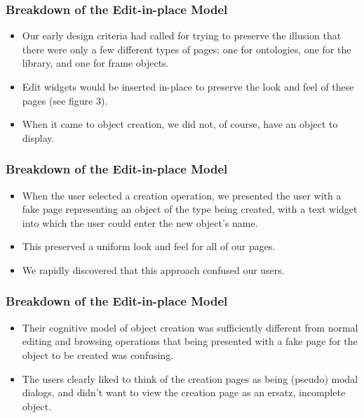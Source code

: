 \documentclass{beamer}
\begin{document}
\begin{frame}
\frametitle{Breakdown of the Edit-in-place Model}

\begin{itemize}
\item Our early design criteria had called for trying to preserve the illusion that there were only a few different types of pages: one for ontologies, one for the library, and one for frame objects.
\item Edit widgets would be inserted in-place to preserve the look and feel of these pages (see figure 3).
\item When it came to object creation, we did not, of course, have an object to display.
\end{itemize}

\end{frame}

\begin{frame}
\frametitle{Breakdown of the Edit-in-place Model}

\begin{itemize}
\item When the user selected a creation operation, we presented the user with a fake page representing an object of the type being created, with a text widget into which the user could enter the new object's name.
\item This preserved a uniform look and feel for all of our pages.
\item We rapidly discovered that this approach confused our users.
\end{itemize}

\end{frame}

\begin{frame}
\frametitle{Breakdown of the Edit-in-place Model}

\begin{itemize}
\item Their cognitive model of object creation was sufficiently different from normal editing and browsing operations that being presented with a fake page for the object to be created was confusing.
\item The users clearly liked to think of the creation pages as being (pseudo) modal dialogs, and didn't want to view the creation page as an ersatz, incomplete object.
\end{itemize}

\end{frame}
\end{document}
